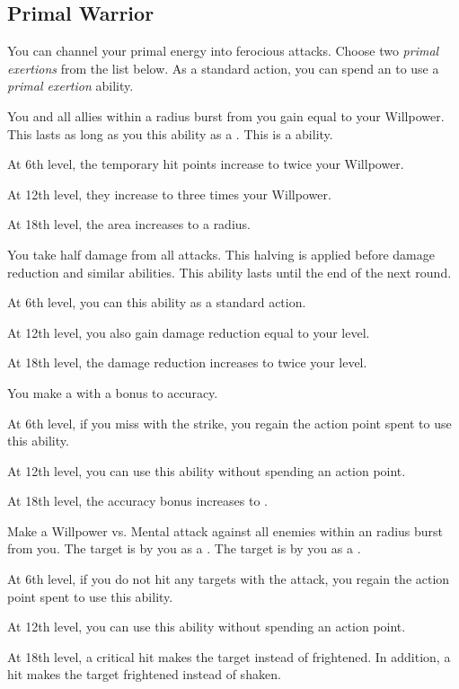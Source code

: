     \subsection{Primal Warrior}
        You can channel your primal energy into ferocious attacks.
        Choose two \textit{primal exertions} from the list below.
        As a standard action, you can spend an  to use a \textit{primal exertion} ability.
        {
             You and all allies within a \arealarge radius burst from you gain  equal to your Willpower.
            This lasts as long as you  this ability as a .
            This is a  ability.
            \par At 6th level, the temporary hit points increase to twice your Willpower.
            \par At 12th level, they increase to three times your Willpower.
            \par At 18th level, the area increases to a \areahuge radius.

             You take half damage from all attacks.
            This halving is applied before damage reduction and similar abilities.
            This ability lasts until the end of the next round.
            \par At 6th level, you can  this ability as a standard action.
            \par At 12th level, you also gain damage reduction equal to your level.
            \par At 18th level, the damage reduction increases to twice your level.

             You make a  with a  bonus to accuracy.
            \par At 6th level, if you miss with the strike, you regain the action point spent to use this ability.
            \par At 12th level, you can use this ability without spending an action point.
            \par At 18th level, the accuracy bonus increases to .

            Make a Willpower vs. Mental attack against all enemies within an \arealarge radius burst from you.
             The target is \shaken by you as a .
             The target is \frightened by you as a .
            \par At 6th level, if you do not hit any targets with the attack, you regain the action point spent to use this ability.
            \par At 12th level, you can use this ability without spending an action point.
            \par At 18th level, a critical hit makes the target \panicked instead of frightened.
            In addition, a hit makes the target frightened instead of shaken.

}
